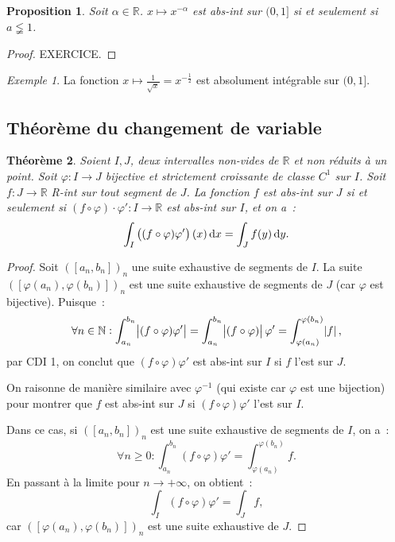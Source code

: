 \documentclass{report}
\newtheorem{thm}{Théorème}[chapter]
\newtheorem{prp}[thm]{Proposition}
\theoremstyle{definition}
\theoremstyle{remark}
\newtheorem{ex}{Exemple}[chapter]
\numberwithin{equation}{section}
\newcommand{\R}{\mathbb R}
\newcommand{\N}{\mathbb N}
\newcommand{\pinfty}{{+\infty}}
\newcommand{\CDII}{{CDI 1}}
\begin{document}
			\begin{prp} Soit $\alpha \in \R$. $x \mapsto x^{-\alpha}$ est abs-int sur $(0, 1]$ si et seulement si $a \lneqq 1$.
			\end{prp}

			\begin{proof} EXERCICE.
			\end{proof}

			\begin{ex} La fonction $x \mapsto \frac 1{\sqrt x} = x^{-\frac 12}$ est absolument intégrable sur $(0, 1]$.
			\end{ex}

		\subsection{Théorème du changement de variable}
			\begin{thm} Soient $I, J$, deux intervalles non-vides de $\R$ et non réduits à un point. Soit $\varphi : I \to J$ bijective et strictement croissante de
			classe $C^1$ sur $I$. Soit $f : J \to \R$ R-int sur tout segment de $J$. La fonction $f$ est abs-int sur $J$ si et seulement si
			$(f \circ \varphi) \cdot \varphi' : I \to \R$ est abs-int sur $I$, et on a~:
			\begin{equation}
				\int_I\left((f \circ \varphi)\varphi'\right)(x)\dif x = \int_Jf(y)\dif y.
			\end{equation}
			\end{thm}

			\begin{proof} Soit $([a_n, b_n])_n$ une suite exhaustive de segments de $I$. La suite $([\varphi(a_n), \varphi(b_n)])_n$ est une suite exhaustive de
			segments de $J$ (car $\varphi$ est bijective). Puisque~:
			\begin{equation}
				\forall n \in \N : \int_{a_n}^{b_n}\abs {(f \circ \varphi)\varphi'} = \int_{a_n}^{b_n}\abs {(f \circ \varphi)}\varphi'
				= \int_{\varphi(a_n)}^{\varphi(b_n)}\abs {f},
			\end{equation}
				par \CDII, on conclut que $(f \circ \varphi)\varphi'$ est abs-int sur $I$ si $f$ l'est sur $J$.

				On raisonne de manière similaire avec $\varphi^{-1}$ (qui existe car $\varphi$ est une bijection) pour montrer que $f$ est abs-int sur $J$ si
				$(f \circ \varphi)\varphi\prime$ l'est sur $I$.

				Dans ce cas, si $([a_n, b_n])_n$ est une suite exhaustive de segments de $I$, on a~:
				\begin{equation}
					\forall n \geq 0 : \int_{a_n}^{b_n}(f \circ \varphi)\varphi\prime = \int_{\varphi(a_n)}^{\varphi(b_n)}f.
				\end{equation}
				En passant à la limite pour $n \to \pinfty$, on obtient~:
				\begin{equation}
					\int_I(f \circ \varphi)\varphi\prime = \int_J f,
				\end{equation}
				car $([\varphi(a_n), \varphi(b_n)])_n$ est une suite exhaustive de $J$.
			\end{proof}
\end{document}

